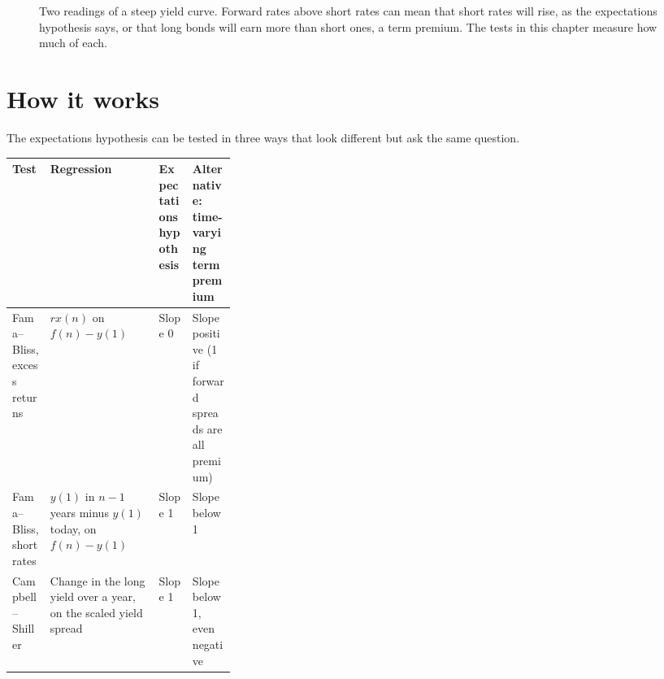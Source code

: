 \begin{figure}[htbp]
\centering
{}
\caption{Two readings of a steep yield curve. Forward rates above short rates can mean that short rates will rise, as the expectations hypothesis says, or that long bonds will earn more than short ones, a term premium. The tests in this chapter measure how much of each.}
\label{fig:10-readings}
\end{figure}

\section{How it works}
\label{sec:10-how}

The expectations hypothesis can be tested in three ways that look different but ask the same question.

\begin{center}
\small
\begin{tabularx}{0.9\linewidth}{@{}>{\raggedright\arraybackslash}p{0.17\linewidth}>{\raggedright\arraybackslash}X>{\raggedright\arraybackslash}p{0.15\linewidth}>{\raggedright\arraybackslash}X@{}}
\toprule
Test & Regression & Expectations hypothesis & Alternative: time-varying term premium \\
\midrule
Fama--Bliss, excess returns & $rx(n)$ on $f(n) - y(1)$ & Slope 0 & Slope positive (1 if forward spreads are all premium) \\
Fama--Bliss, short rates & $y(1)$ in $n-1$ years minus $y(1)$ today, on $f(n) - y(1)$ & Slope 1 & Slope below 1 \\
Campbell--Shiller & Change in the long yield over a year, on the scaled yield spread & Slope 1 & Slope below 1, even negative \\
\bottomrule
\end{tabularx}
\end{center}

